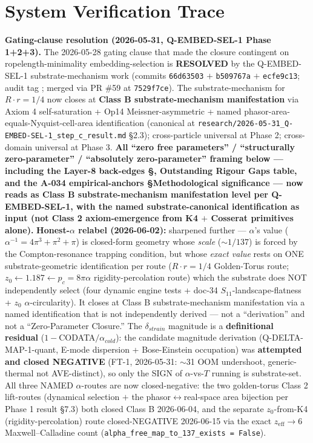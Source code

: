 \chapter{System Verification Trace}
\label{app:verification}

\textbf{Gating-clause resolution (2026-05-31, Q-EMBED-SEL-1 Phase 1+2+3).} The 2026-05-28 gating clause that made the closure contingent on ropelength-minimality embedding-selection is \textbf{RESOLVED} by the Q-EMBED-SEL-1 substrate-mechanism work (commits \texttt{66d63503} $+$ \texttt{b509767a} $+$ \texttt{ecfe9c13}; audit tag \texttt{}; merged via PR \#59 at \texttt{7529f7ce}). The substrate-mechanism for $R \cdot r = 1/4$ now closes at \textbf{Class B substrate-mechanism manifestation} via Axiom 4 self-saturation + Op14 Meissner-asymmetric + named phasor-area-equals-Nyquist-cell-area identification (canonical at \texttt{research/2026-05-31\_Q-EMBED-SEL-1\_step\_c\_result.md} \S2.3); cross-particle universal at Phase 2; cross-domain universal at Phase 3. \textbf{All ``zero free parameters'' / ``structurally zero-parameter'' / ``absolutely zero-parameter'' framing below --- including the Layer-8 back-edges \S, Outstanding Rigour Gaps table, and the A-034 empirical-anchors \S Methodological significance --- now reads as Class B substrate-mechanism manifestation level per Q-EMBED-SEL-1, with the named substrate-canonical identification as input (not Class 2 axiom-emergence from K4 $+$ Cosserat primitives alone).} \textbf{Honest-$\alpha$ relabel (2026-06-02):} sharpened further --- $\alpha$'s value ($\alpha^{-1} = 4\pi^3 + \pi^2 + \pi$) is closed-form geometry whose \emph{scale} ($\sim 1/137$) is forced by the Compton-resonance trapping condition, but whose \emph{exact value} rests on ONE substrate-geometric identification per route ($R \cdot r = 1/4$ Golden-Torus route; $z_0 \leftarrow 1.187 \leftarrow p_c = 8\pi\alpha$ rigidity-percolation route) which the substrate does NOT independently select (four dynamic engine tests + doc-34 $S_{11}$-landscape-flatness + $z_0$ $\alpha$-circularity). It closes at Class B substrate-mechanism manifestation via a named identification that is not independently derived --- not a ``derivation'' and not a ``Zero-Parameter Closure.'' The $\delta_{strain}$ magnitude is a \textbf{definitional residual} ($1-$CODATA$/\alpha_{cold}$): the candidate magnitude derivation (Q-DELTA-MAP-1-quant, E-mode dispersion + Bose-Einstein occupation) was \textbf{attempted and closed NEGATIVE} (FT-1, 2026-05-31: $\sim$31 OOM undershoot, generic-thermal not AVE-distinct), so only the SIGN of $\alpha$-vs-$T$ running is substrate-set. All three NAMED $\alpha$-routes are now closed-negative: the two golden-torus Class 2 lift-routes (dynamical selection $+$ the phasor$\leftrightarrow$real-space area bijection per Phase 1 result \S7.3) both closed Class B 2026-06-04, and the separate $z_0$-from-K4 (rigidity-percolation) route closed-NEGATIVE 2026-06-15 via the exact $z_{\text{eff}} \to 6$ Maxwell--Calladine count (\texttt{alpha\_free\_map\_to\_137\_exists = False}). %
